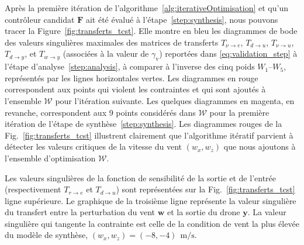 Après la première itération de l'algorithme~\ref{alg:iterativeOptimisation} et qu'un contrôleur candidat $\boldsymbol{F}$ ait été évalué à l'étape~\ref{step:synthesis}, nous pouvons tracer la Figure~\ref{fig:transferts_tcst}. Elle montre en bleu les diagrammes de bode des valeurs singulières maximales des matrices de transferts $T_{\nu \rightarrow e}$, $T_{d \rightarrow u}$, $T_{\nu \rightarrow u}$, $T_{d \rightarrow y}$, et $T_{w \rightarrow y}$ (associées à la valeur de $\gamma_{\text{v}}$) reportées dans \eqref{eq:validation_step} à l'étape d'analyse~\ref{step:analysis}, à comparer à l'inverse des cinq poids $W_1$--$W_5$, représentés par les lignes horizontales vertes. 
Les diagrammes en rouge correspondent aux points qui violent les contraintes et qui sont ajoutés à l'ensemble ${\mathcal W}$ pour l'itération suivante. Les quelques diagrammes en magenta, en revanche, correspondent aux 9 points considérés dans ${\mathcal W}$ pour la première itération de l'étape de synthèse~\ref{step:synthesis}.
Les diagrammes rouges de la Fig.~\ref{fig:transferts_tcst} illustrent clairement que l'algorithme itératif parvient à détecter les valeurs critiques de la vitesse du vent $(w_x,w_z)$ que nous ajoutons à l'ensemble d'optimisation ${\mathcal W}$.

Les valeurs singulières de la fonction de sensibilité de la sortie et de l'entrée (respectivement $T_{r \rightarrow e}$ et $T_{d \rightarrow u}$) sont représentées sur la Fig.~\ref{fig:transferts_tcst} ligne supérieure. Le graphique de la troisième ligne représente la valeur singulière du transfert entre la perturbation du vent $\boldsymbol{w}$ et la sortie du drone $\boldsymbol{y}$. La valeur singulière qui tangente la contrainte est celle de la condition de vent la plus élevée du modèle de synthèse, $(w_x, w_z) = (-8,-4)~\SI{}{\meter\per\second}$.

